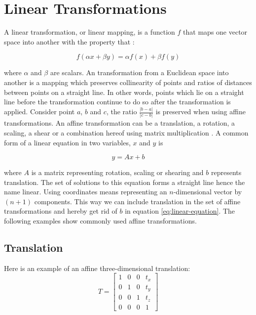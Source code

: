 
\section{Linear Transformations}
\label{sec:linear_transformation}
A linear transformation, or linear mapping, is a function $f$ that maps
one vector space into another with the property that :

\begin{equation}
f(\alpha x + \beta y) = \alpha f(x) + \beta f(y)
\end{equation}

where $\alpha$ and $\beta$ are scalars.
An  transformation from a Euclidean space into another is
a mapping which preserves collinearity of points and ratios of
distances between points on a straight line. In other words, points which lie
on a straight line before the transformation continue to do so after the transformation is
applied. Consider point $a$, $b$ and $c$, the ratio $\frac{ \vert
  b-a\vert}{\vert c-b \vert}$ is preserved when using affine transformations.
An affine transformation can be a translation, a rotation, a scaling,
a shear or a combination hereof using matrix
multiplication .
%
A common form of a linear equation in two variables, $x$ and $y$ is 

\begin{equation}
\label{eq:linear-equation}
y = A x + b
\end{equation}

where $A$ is a matrix representing rotation, scaling or shearing and
$b$ represents translation. 
The set of solutions to this equation forms a straight line hence the
name linear. Using  coordinates means representing an
$n$-dimensional vector by $(n+1)$ components. This way we can
include translation in the set of affine transformations and hereby get rid of
$b$ in equation \eqref{eq:linear-equation}. 
The following examples show commonly used affine transformations. \\

\subsection*{Translation}
\label{sec:basic_math_translation}
Here is an example of an affine three-dimensional translation:
\begin{equation}
\label{eq:translation_matrix}
T = 
\begin{bmatrix} 
1 & 0 & 0 & t_x \\ 
0 & 1 & 0 & t_y \\ 
0 & 0 & 1 & t_z \\
0 & 0 & 0 & 1 
\end{bmatrix} 
\end{equation} 

